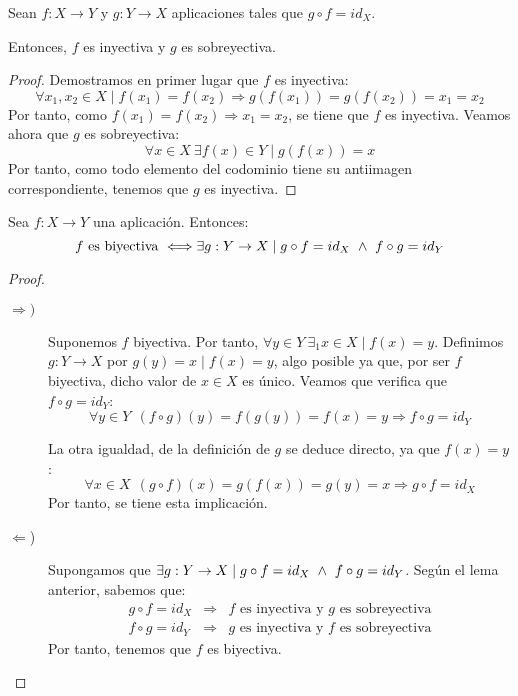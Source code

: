 \begin{lema}
    Sean $f:X\rightarrow Y$ y $g:Y \rightarrow X$ aplicaciones tales que $g \circ f = id_X$.
    
    Entonces, $f$ es inyectiva y $g$ es sobreyectiva.
\end{lema}
\begin{proof}
    Demostramos en primer lugar que $f$ es inyectiva:
    $$\forall x_1, x_2 \in X \mid f(x_1) = f(x_2) \Rightarrow g(f(x_1)) = g(f(x_2)) = x_1 = x_2$$
    Por tanto, como $f(x_1)=f(x_2)\Longrightarrow x_1=x_2$, se tiene que $f$ es inyectiva. Veamos ahora que $g$ es sobreyectiva:
    $$\forall x \in X ~ \exists f(x) \in Y \mid g(f(x)) = x$$
    Por tanto, como todo elemento del codominio tiene su antiimagen correspondiente, tenemos que $g$ es inyectiva.
\end{proof}

\begin{teo} \label{teo:CarBiyect}
    Sea $f:X \rightarrow Y$ una aplicación. Entonces:
    $$f \mbox{ es biyectiva } \Longleftrightarrow \exists g:Y \rightarrow X \mid g \circ f = id_X \ \land \  f \circ g = id_Y$$
\end{teo}
\begin{proof}
    \begin{description}
        \item[$\Longrightarrow)$] Suponemos $f$ biyectiva. Por tanto, $\forall y \in Y~\exists_1 x \in X \mid f(x) = y$. Definimos $g:Y\to X$ por $g(y) = x \mid f(x) = y$, algo posible ya que, por ser $f$ biyectiva, dicho valor de $x\in X$ es único. Veamos que verifica que $f\circ g=id_Y$:
        \begin{equation*}
            \forall y \in Y~~(f \circ g)(y) = f(g(y)) = f(x) = y \Rightarrow f \circ g = id_Y
        \end{equation*}

        La otra igualdad, de la definición de $g$ se deduce directo, ya que $f(x)=y$:
        \begin{equation*}
            \forall x\in X~~(g\circ f)(x) = g(f(x)) = g(y) = x \Rightarrow g\circ f = id_X
        \end{equation*}
        Por tanto, se tiene esta implicación.

        \item[$\Longleftarrow$)]  Supongamos que $\exists g:Y \rightarrow X \mid g \circ f = id_X \ \land \  f \circ g = id_Y$.
        Según el lema anterior, sabemos que:
            $$\left.\begin{array}{lll}
                g \circ f = id_X & \Rightarrow & f \mbox{ es inyectiva y } g \mbox{ es sobreyectiva} \\
                f \circ g = id_Y & \Rightarrow & g \mbox{ es inyectiva y } f \mbox{ es sobreyectiva}
            \end{array} \right.$$
        Por tanto, tenemos que $f$ es biyectiva.
    \end{description}
\end{proof}

